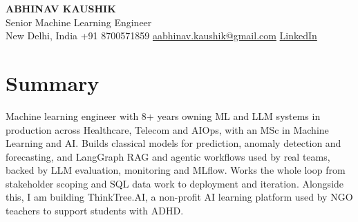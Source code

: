 \documentclass[10pt,a4paper]{article}
\begin{document}
\begin{center}
  {\LARGE\bfseries ABHINAV KAUSHIK}\\[2pt]
  {\large Senior Machine Learning Engineer}\\[2pt]
  New Delhi, India \textbar{} +91 8700571859 \textbar{} \href{mailto:aabhinav.kaushik@gmail.com}{aabhinav.kaushik@gmail.com} \textbar{} \href{https://www.linkedin.com/in/abhinav-kaushik10/}{LinkedIn}  
\end{center}

\section{Summary}
Machine learning engineer with 8+ years owning ML and LLM systems in production across Healthcare, Telecom and AIOps, with an MSc in Machine Learning and AI. Builds classical models for prediction, anomaly detection and forecasting, and LangGraph RAG and agentic workflows used by real teams, backed by LLM evaluation, monitoring and MLflow. Works the whole loop from stakeholder scoping and SQL data work to deployment and iteration. Alongside this, I am building ThinkTree.AI, a non-profit AI learning platform used by NGO teachers to support students with ADHD.
\end{document}
